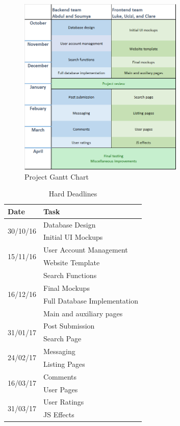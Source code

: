 \documentclass[12pt]{article}
\begin{document}
\begin{figure}[ht!]
    \centering
    \includegraphics[width=0.7\textwidth]{images/plan.png}
    \caption{Project Gantt Chart}
    \label{fig:gantt-chart}
\end{figure}

\pagebreak
\begin{table}[ht!]
    \centering
    \begin{tabular}{|l|l|}
        \hline
        Date & Task\\
        \hline
        \multirow{2}{2cm}{30/10/16} & Database Design\\
        & Initial UI Mockups\\
        \hline
        \multirow{2}{2cm}{15/11/16} & User Account Management\\
        & Website Template\\
        \hline
        \multirow{4}{2cm}{16/12/16} & Search Functions\\
        & Final Mockups\\
        & Full Database Implementation\\
        & Main and auxiliary pages\\
        \hline
        \multirow{2}{2cm}{31/01/17} & Post Submission\\
        & Search Page\\
        \hline
        \multirow{2}{2cm}{24/02/17} & Messaging\\
        & Listing Pages\\
        \hline
        \multirow{2}{2cm}{16/03/17} & Comments\\
        & User Pages\\
        \hline
        \multirow{2}{2cm}{31/03/17} & User Ratings\\
        & JS Effects\\
        \hline

    \end{tabular}
    \caption{Hard Deadlines}
    \label{tab:deadlines}
\end{table}
\pagebreak
\end{document}
